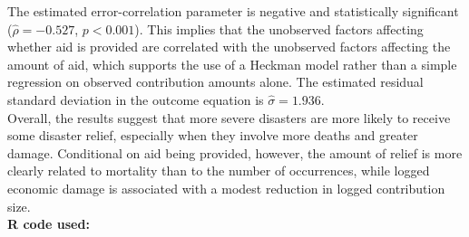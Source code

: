 \documentclass[12pt,letterpaper]{article}
\begin{document}
\noindent The estimated error-correlation parameter is negative and statistically significant (\(\hat{\rho} = -0.527\), \(p < 0.001\)). This implies that the unobserved factors affecting whether aid is provided are correlated with the unobserved factors affecting the amount of aid, which supports the use of a Heckman model rather than a simple regression on observed contribution amounts alone. The estimated residual standard deviation in the outcome equation is \(\hat{\sigma} = 1.936\).\\

\noindent Overall, the results suggest that more severe disasters are more likely to receive some disaster relief, especially when they involve more deaths and greater damage. Conditional on aid being provided, however, the amount of relief is more clearly related to mortality than to the number of occurrences, while logged economic damage is associated with a modest reduction in logged contribution size.\\

\noindent \textbf{R code used:}


\end{document}

